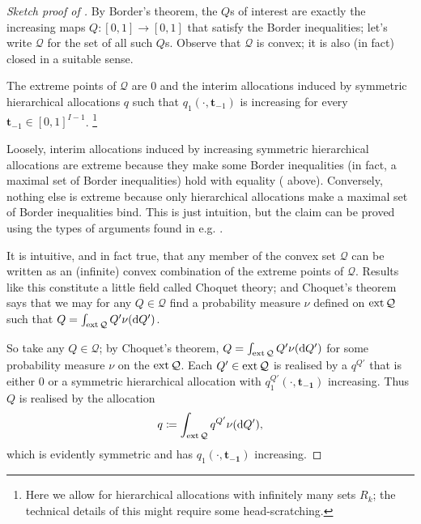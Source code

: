 \begin{proof}[Sketch proof of ]
	By Border's theorem, the $Q$s of interest
	are exactly the increasing maps $Q : [0,1] \to [0,1]$ that satisfy the Border inequalities;
	let's write $\mathcal{Q}$ for the set of all such $Q$s.
	Observe that $\mathcal{Q}$ is convex; it is also (in fact) closed in a suitable sense.

	\begin{claim}
		\label{claim:manellivincent_extr}
		The extreme points of $\mathcal{Q}$
		are $0$ and the interim allocations induced by symmetric hierarchical allocations $q$ such that $q_1(\cdot,\boldsymbol{t}_{-1})$ is increasing for every $\boldsymbol{t}_{-1} \in [0,1]^{I-1}$.%
			\footnote{Here we allow for hierarchical allocations with infinitely many sets $R_k$; the technical details of this might require some head-scratching.}
	\end{claim}

	Loosely, interim allocations induced by increasing symmetric hierarchical allocations are extreme because they make some Border inequalities (in fact, a maximal set of Border inequalities) hold with equality ( above).
	Conversely, nothing else is extreme because only hierarchical allocations make a maximal set of Border inequalities bind.
	This is just intuition, but the claim can be proved using the types of arguments found in e.g. \textcite{KleinerMoldovanuStrack2021}.

	It is intuitive, and in fact true, that any member of the convex set $\mathcal{Q}$ can be written as an (infinite) convex combination of the extreme points of $\mathcal{Q}$.
	Results like this constitute a little field called Choquet theory;
	and Choquet's theorem says that
	we may for any $Q \in \mathcal{Q}$ find a probability measure $\nu$ defined on $\operatorname*{ext} \mathcal{Q}$ such that $Q = \int_{\operatorname*{ext} \mathcal{Q}} Q' \nu( \mathrm{d} Q' )$.

	So take any $Q \in \mathcal{Q}$;
	by Choquet's theorem, $Q = \int_{\operatorname*{ext} \mathcal{Q}} Q' \nu( \mathrm{d} Q' )$ for some probability measure $\nu$ on the $\operatorname*{ext} \mathcal{Q}$.
	Each $Q' \in \operatorname*{ext} \mathcal{Q}$ is realised by a $q^{Q'}$
	that is either $0$ or a symmetric hierarchical allocation with $q^{Q'}_1(\cdot,\boldsymbol{t_{-1}})$ increasing.
	Thus $Q$ is realised by the allocation
	\begin{equation*}
		q \coloneqq \int_{\operatorname*{ext} \mathcal{Q}} q^{Q'} \nu( \mathrm{d} Q' ) ,
	\end{equation*}
	which is evidently symmetric and has $q_1(\cdot,\boldsymbol{t_{-1}})$ increasing.
\end{proof}

